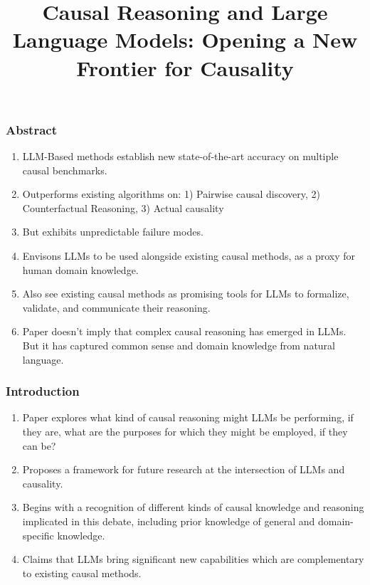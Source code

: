\documentclass{beamer}
\begin{document}
\title[]{Causal Reasoning and Large Language Models: Opening a New Frontier for Causality}
\author {}
\date{}
\maketitle

\begin{frame}
	\frametitle{Abstract}
	\begin{enumerate}
		\item LLM-Based methods establish new state-of-the-art accuracy on multiple causal benchmarks.
		\item Outperforms existing algorithms on: 1) Pairwise causal discovery, 2) Counterfactual Reasoning, 3) Actual causality
		\item But exhibits unpredictable failure modes.
		\item Envisons LLMs to be used alongside existing causal
			methods, as a proxy for human domain knowledge.
		\item Also see existing causal methods as promising tools for LLMs to
			formalize, validate, and communicate their reasoning.
		\item Paper doesn't imply that complex causal reasoning has
			emerged in LLMs. But it has captured common sense and
			domain knowledge from natural language.
	\end{enumerate}
\end{frame}

\begin{frame}
	\frametitle{Introduction}
	\begin{enumerate}
		\item Paper explores what kind of causal reasoning might LLMs
			be performing, if they are, what are the purposes for
			which they might be employed, if they can be?
		\item Proposes a framework for future research at the intersection of
			LLMs and causality.
		\item Begins with a recognition of different kinds of causal knowledge 
			and reasoning implicated in this debate, including prior knowledge
			of general and domain-specific knowledge.
		\item Claims that LLMs bring significant new capabilities which
			are complementary to existing causal methods.
	\end{enumerate}
\end{frame}
\end{document}
